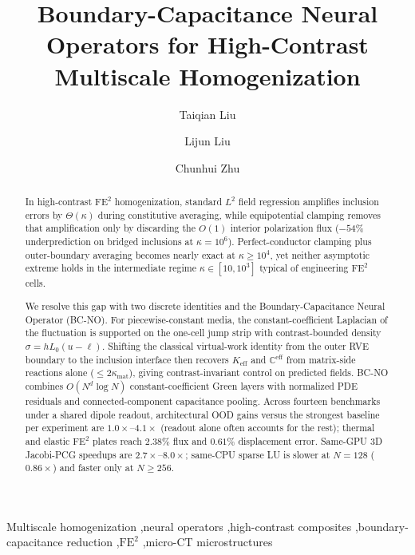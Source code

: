 \documentclass[preprint,11pt]{elsarticle}
\newcommand{\Keff}{K_{\mathrm{eff}}}
\newcommand{\Ceff}{\mathbb{C}^{\mathrm{eff}}}
\begin{document}
\begin{frontmatter}

\title{Boundary-Capacitance Neural Operators for High-Contrast Multiscale Homogenization}

\author[aff1]{Taiqian Liu}
\author[aff1,aff2]{Lijun Liu}
\author[aff3]{Chunhui Zhu}

\address[aff1]{Department of Automation, School of Aerospace Engineering, Xiamen University, Xiamen 361005, China}
\address[aff2]{Shenzhen Research Institute of Xiamen University, Shenzhen 518000, China}
\address[aff3]{Institute of Electromagnetics and Acoustics, Xiamen University, Xiamen 361005, China}

\begin{abstract}
In high-contrast $\mathrm{FE}^2$ homogenization, standard $L^2$ field regression amplifies inclusion errors by $\Theta(\kappa)$ during constitutive averaging, while equipotential clamping removes that amplification only by discarding the $O(1)$ interior polarization flux ($-54\%$ underprediction on bridged inclusions at $\kappa=10^6$). Perfect-conductor clamping plus outer-boundary averaging becomes nearly exact at $\kappa\ge 10^4$, yet neither asymptotic extreme holds in the intermediate regime $\kappa\in[10,10^3]$ typical of engineering $\mathrm{FE}^2$ cells.

We resolve this gap with two discrete identities and the Boundary-Capacitance Neural Operator (BC-NO). For piecewise-constant media, the constant-coefficient Laplacian of the fluctuation is supported on the one-cell jump strip with contrast-bounded density $\sigma=h L_0(u-\ell)$. Shifting the classical virtual-work identity from the outer RVE boundary to the inclusion interface then recovers $\Keff$ and $\Ceff$ from matrix-side reactions alone ($\le 2\kappa_{\mathrm{mat}}$), giving contrast-invariant control on predicted fields. BC-NO combines $O(N^d\log N)$ constant-coefficient Green layers with normalized PDE residuals and connected-component capacitance pooling. Across fourteen benchmarks under a shared dipole readout, architectural OOD gains versus the strongest baseline per experiment are $1.0\times$--$4.1\times$ (readout alone often accounts for the rest); thermal and elastic $\mathrm{FE}^2$ plates reach $2.38\%$ flux and $0.61\%$ displacement error. Same-GPU 3D Jacobi-PCG speedups are $2.7\times$--$8.0\times$; same-CPU sparse LU is slower at $N=128$ ($0.86\times$) and faster only at $N\ge 256$.
\end{abstract}

\begin{keyword}
Multiscale homogenization \sep neural operators \sep high-contrast composites \sep boundary-capacitance reduction \sep $\mathrm{FE}^2$ \sep micro-CT microstructures
\end{keyword}

\end{frontmatter}
\end{document}
